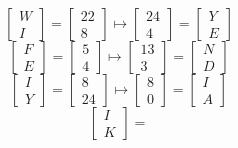 \documentclass[letterpaper,11pt]{article}
\begin{document}
\begin{enumerate}
\begin{enumerate}
\begin{equation*}
            \begin{bmatrix} W  \\ I \end{bmatrix} =
            \begin{bmatrix} 22 \\ 8 \end{bmatrix} \mapsto
            \begin{bmatrix} 24 \\ 4 \end{bmatrix} =
            \begin{bmatrix} Y \\ E \end{bmatrix}
        \end{equation*}
        \begin{equation*}
            \begin{bmatrix} F \\ E \end{bmatrix} =
            \begin{bmatrix} 5 \\ 4 \end{bmatrix} \mapsto
            \begin{bmatrix} 13 \\ 3 \end{bmatrix} =
            \begin{bmatrix} N \\ D \end{bmatrix}
        \end{equation*}
        \begin{equation*}
            \begin{bmatrix} I \\ Y \end{bmatrix} =
            \begin{bmatrix} 8 \\ 24 \end{bmatrix} \mapsto
            \begin{bmatrix} 8 \\ 0 \end{bmatrix} =
            \begin{bmatrix} I \\ A \end{bmatrix}
        \end{equation*}
        \begin{equation*}
            \begin{bmatrix} I \\ K \end{bmatrix} =

\end{equation*}
\end{enumerate}
\end{enumerate}
\end{document}
